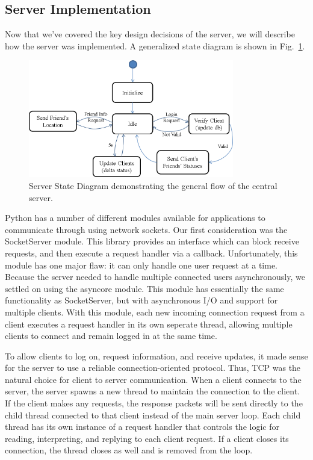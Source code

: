 \subsection{Server Implementation}
Now that we've covered the key design decisions of the server, we will describe how the server
was implemented. A generalized state diagram is shown in Fig.~\ref{fig:server_diag}.

\begin{figure}[!t]
   \centering
      \includegraphics[width=0.8\textwidth]{pics/Server_StateDiagram2}
   \caption{Server State Diagram demonstrating the general flow of the central server.}
\label{fig:server_diag}
\end{figure}


Python has a number of different modules available for applications to communicate
through using network sockets. Our first consideration was the SocketServer module. This 
library
provides an interface which can block receive requests, and then execute a request
handler via a callback. Unfortunately, this module has one major flaw: it can only handle
one user request at a time. Because the server needed to handle multiple connected users
asynchronously, we settled on using the asyncore module. This module has essentially
the same functionality as SocketServer, but with asynchronous I/O and support for multiple clients. With this module, each
new incoming connection request from a client executes a request handler in its own seperate thread, allowing 
multiple clients to connect and remain logged in at the same time.

To allow clients to log on, request information, and receive updates, it made
sense for the server to use a reliable connection-oriented protocol. Thus, TCP was the 
natural
choice for client to server communication. When a client connects to the server, the server spawns a new thread to maintain
the connection to the client. If the client makes any requests, the response packets will 
be sent
directly to the child thread connected to that client instead of the main server loop. Each child thread has its own
instance of a request handler that controls the logic for reading, interpreting, and replying
to each client request. If a client closes its connection, the thread closes as well and is
removed from the loop. 

